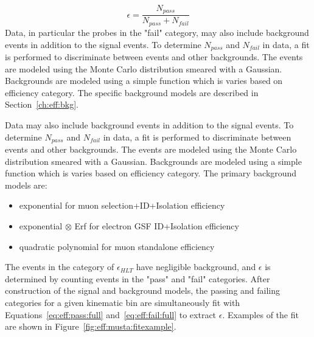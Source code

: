 \begin{equation}
\epsilon = \frac{N_{pass}}{N_{pass}+N_{fail}}
\label{eq:eff:eq}
\end{equation}
Data, in particular the probes in the "fail" category, may also include background events in addition to the \zll signal events. To determine $N_{pass}$ and $N_{fail}$ in data, a fit is performed to discriminate between \zll events and other backgrounds. The \zll events are modeled using the Monte Carlo distribution smeared with a Gaussian. Backgrounds are modeled using a simple function which is varies based on efficiency category. The specific background models are described in Section~\ref{ch:eff:bkg}.


Data may also include background events in addition to the \zll signal events. To determine $N_{pass}$ and $N_{fail}$ in data, a fit is performed to discriminate between \zll events and other backgrounds. The \zll events are modeled using the Monte Carlo distribution smeared with a Gaussian. Backgrounds are modeled using a simple function which is varies based on efficiency category. The primary background models are:



\begin{itemize}
\item exponential for muon selection+ID+Isolation efficiency
\item exponential $\otimes$ Erf for electron GSF ID+Isolation efficiency
\item quadratic polynomial for muon standalone efficiency
\end{itemize}

The events in the category of $\epsilon_{HLT}$ have negligible background, and $\epsilon$ is determined by counting events in the "pass" and "fail" categories.
After construction of the signal and background models, the passing and failing categories for a given kinematic bin are simultaneously fit with Equations~\ref{eq:eff:pass:full} and~\ref{eq:eff:fail:full} to extract $\epsilon$. Examples of the fit are shown in Figure~\ref{fig:eff:musta:fitexample}.

